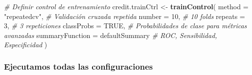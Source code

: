 \documentclass[
]{article}
\newenvironment{Shaded}{\begin{snugshade}}{\end{snugshade}}
\newcommand{\AttributeTok}[1]{\textcolor[rgb]{0.13,0.29,0.53}{#1}}
\newcommand{\CommentTok}[1]{\textcolor[rgb]{0.56,0.35,0.01}{\textit{#1}}}
\newcommand{\ConstantTok}[1]{\textcolor[rgb]{0.56,0.35,0.01}{#1}}
\newcommand{\DecValTok}[1]{\textcolor[rgb]{0.00,0.00,0.81}{#1}}
\newcommand{\FunctionTok}[1]{\textcolor[rgb]{0.13,0.29,0.53}{\textbf{#1}}}
\newcommand{\NormalTok}[1]{#1}
\newcommand{\OtherTok}[1]{\textcolor[rgb]{0.56,0.35,0.01}{#1}}
\newcommand{\StringTok}[1]{\textcolor[rgb]{0.31,0.60,0.02}{#1}}
\begin{document}
\begin{Shaded}
\begin{Highlighting}[]
\CommentTok{\# Definir control de entrenamiento}
\NormalTok{credit.trainCtrl }\OtherTok{\textless{}{-}} \FunctionTok{trainControl}\NormalTok{(}
  \AttributeTok{method =} \StringTok{"repeatedcv"}\NormalTok{,  }\CommentTok{\# Validación cruzada repetida}
  \AttributeTok{number =} \DecValTok{10}\NormalTok{,            }\CommentTok{\# 10 folds}
  \AttributeTok{repeats =} \DecValTok{3}\NormalTok{,            }\CommentTok{\# 3 repeticiones}
  \AttributeTok{classProbs =} \ConstantTok{TRUE}\NormalTok{,      }\CommentTok{\# Probabilidades de clase para métricas avanzadas}
  \AttributeTok{summaryFunction =}\NormalTok{ defaultSummary  }\CommentTok{\# ROC, Sensibilidad, Especificidad}
\NormalTok{)}
\end{Highlighting}
\end{Shaded}

\hypertarget{ejecutamos-todas-las-configuraciones}{%
\subsubsection{Ejecutamos todas las
configuraciones}\label{ejecutamos-todas-las-configuraciones}}
\end{document}
